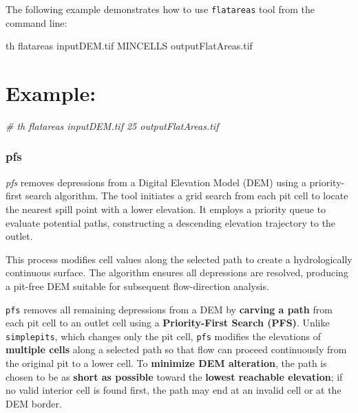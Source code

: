 \documentclass[
]{book}
\newenvironment{Shaded}{\begin{snugshade}}{\end{snugshade}}
\newcommand{\CommentTok}[1]{\textcolor[rgb]{0.56,0.35,0.01}{\textit{#1}}}
\newcommand{\ExtensionTok}[1]{#1}
\newcommand{\NormalTok}[1]{#1}
\theoremstyle{definition}
\theoremstyle{definition}
\theoremstyle{definition}
\theoremstyle{definition}
\theoremstyle{remark}
\begin{document}
The following example demonstrates how to use \texttt{flatareas} tool from the command line:

\begin{Shaded}
\begin{Highlighting}[]
\ExtensionTok{th}\NormalTok{ flatareas inputDEM.tif MINCELLS outputFlatAreas.tif}
\end{Highlighting}
\end{Shaded}

\chapter{Example:}\label{example}

\begin{Shaded}
\begin{Highlighting}[]
\CommentTok{\# th flatareas inputDEM.tif 25 outputFlatAreas.tif}
\end{Highlighting}
\end{Shaded}

\subsection{pfs}\label{pfs}

\emph{pfs} removes depressions from a Digital Elevation Model (DEM) using a priority-first search algorithm. The tool initiates a grid search from each pit cell to locate the nearest spill point with a lower elevation. It employs a priority queue to evaluate potential paths, constructing a descending elevation trajectory to the outlet.

This process modifies cell values along the selected path to create a hydrologically continuous surface. The algorithm ensures all depressions are resolved, producing a pit-free DEM suitable for subsequent flow-direction analysis.

\texttt{pfs} removes all remaining depressions from a DEM by \textbf{carving a path} from each pit cell to an outlet cell using a \textbf{Priority-First Search (PFS)}. Unlike \texttt{simplepits}, which changes only the pit cell, \texttt{pfs} modifies the elevations of \textbf{multiple cells} along a selected path so that flow can proceed continuously from the original pit to a lower cell. To \textbf{minimize DEM alteration}, the path is chosen to be as \textbf{short as possible} toward the \textbf{lowest reachable elevation}; if no valid interior cell is found first, the path may end at an invalid cell or at the DEM border.
\end{document}
